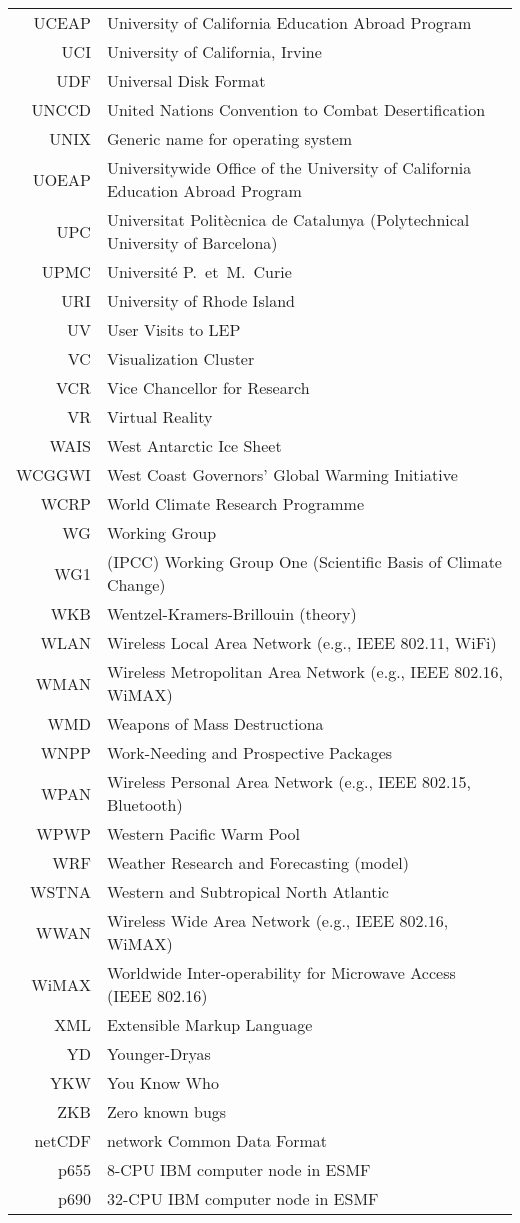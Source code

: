 \documentclass[12pt,twoside]{article}
\begin{document}
\begin{longtable}[>{\bfseries}l]{>{\ttfamily}r l}
UCEAP & University of California Education Abroad Program \\
UCI & University of California, Irvine \\
UDF & Universal Disk Format \\
UNCCD & United Nations Convention to Combat Desertification \\
UNIX & Generic name for operating system \\
UOEAP & Universitywide Office of the University of California Education Abroad Program \\
UPC & Universitat Polit\`{e}cnica de Catalunya (Polytechnical University of Barcelona) \\
UPMC & Universit\'{e} P.~et~M.\ Curie \\
URI & University of Rhode Island \\
UV & User Visits to LEP \\
VC & Visualization Cluster \\
VCR & Vice Chancellor for Research \\
VR & Virtual Reality \\
WAIS & West Antarctic Ice Sheet \\
WCGGWI & West Coast Governors' Global Warming Initiative \\
WCRP & World Climate Research Programme \\
WG & Working Group \\
WG1 & (IPCC) Working Group One (Scientific Basis of Climate Change) \\
WKB & Wentzel-Kramers-Brillouin (theory) \\
WLAN & Wireless Local Area Network (e.g., IEEE 802.11, WiFi) \\
WMAN & Wireless Metropolitan Area Network (e.g., IEEE 802.16, WiMAX) \\
WMD & Weapons of Mass Destructiona \\
WNPP & Work-Needing and Prospective Packages \\
WPAN & Wireless Personal Area Network (e.g., IEEE 802.15, Bluetooth) \\
WPWP & Western Pacific Warm Pool \\
WRF & Weather Research and Forecasting (model) \\
WSTNA & Western and Subtropical North Atlantic \\
WWAN & Wireless Wide Area Network (e.g., IEEE 802.16, WiMAX) \\
WiMAX & Worldwide Inter-operability for Microwave Access (IEEE 802.16) \\
XML & Extensible Markup Language \\
YD & Younger-Dryas \\
YKW & You Know Who \\
ZKB & Zero known bugs \\
netCDF & network Common Data Format \\
p655 & 8-CPU IBM computer node in ESMF \\
p690 & 32-CPU IBM computer node in ESMF \\
\end{longtable}
\end{document}
